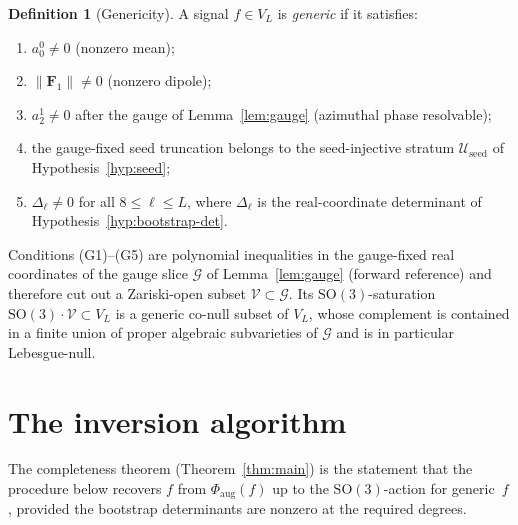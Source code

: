 \documentclass[11pt]{article}
\theoremstyle{plain}
\theoremstyle{definition}
\newtheorem{definition}[theorem]{Definition}
\theoremstyle{remark}
\newcommand{\SO}{\mathrm{SO}}
\newcommand{\norm}[1]{\lVert #1 \rVert}
\newcommand{\Phiaug}{\Phi_{\mathrm{aug}}}
\newcommand{\Useed}{\mathcal{U}_{\mathrm{seed}}}
\begin{document}
\begin{definition}[Genericity]\label{def:gen}
A signal $f \in V_L$ is \emph{generic} if it satisfies:
\begin{enumerate}[nosep,label=(G\arabic*)]
  \item $a_0^0 \ne 0$ (nonzero mean);
  \item $\norm{\mathbf{F}_1}\ne 0$ (nonzero dipole);
  \item $a_2^1 \ne 0$ after the gauge of Lemma~\ref{lem:gauge}
    (azimuthal phase resolvable);
  \item the gauge-fixed seed truncation belongs to the seed-injective
    stratum $\Useed$ of Hypothesis~\ref{hyp:seed};
  \item $\Delta_\ell \ne 0$ for all $8 \le \ell \le L$, where
    $\Delta_\ell$ is the real-coordinate determinant of
    Hypothesis~\ref{hyp:bootstrap-det}.
\end{enumerate}
Conditions (G1)--(G5) are polynomial inequalities in the gauge-fixed
real coordinates of the gauge slice $\mathcal{G}$ of
Lemma~\ref{lem:gauge} (forward reference) and therefore cut out a
Zariski-open subset $\mathcal{V}\subset\mathcal{G}$. Its
$\SO(3)$-saturation $\SO(3)\cdot\mathcal{V}\subset V_L$ is a generic
co-null subset of $V_L$, whose complement is contained in a finite
union of proper algebraic subvarieties of $\mathcal{G}$ and is in
particular Lebesgue-null.
\end{definition}

\section{The inversion algorithm}
\label{sec:algorithm}

The completeness theorem (Theorem~\ref{thm:main}) is the statement
that the procedure below recovers $f$ from $\Phiaug(f)$ up to the
$\SO(3)$-action for generic~$f$, provided the bootstrap determinants
are nonzero at the required degrees.
\end{document}
